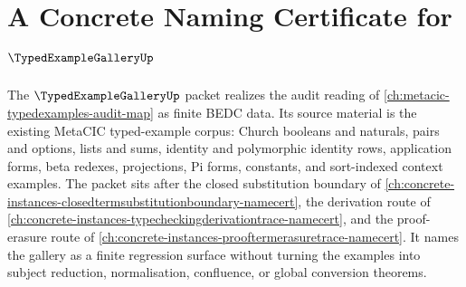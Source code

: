 \chapter{A Concrete Naming Certificate for $\TypedExampleGalleryUp$}
\label{ch:concrete-instances-typedexamplegallery-namecert}

The $\TypedExampleGalleryUp$ packet realizes the audit reading of \autoref{ch:metacic-typedexamples-audit-map} as finite BEDC data. Its source material is the existing MetaCIC typed-example corpus: Church booleans and naturals, pairs and options, lists and sums, identity and polymorphic identity rows, application forms, beta redexes, projections, Pi forms, constants, and sort-indexed context examples. The packet sits after the closed substitution boundary of \autoref{ch:concrete-instances-closedtermsubstitutionboundary-namecert}, the derivation route of \autoref{ch:concrete-instances-typecheckingderivationtrace-namecert}, and the proof-erasure route of \autoref{ch:concrete-instances-prooftermerasuretrace-namecert}. It names the gallery as a finite regression surface without turning the examples into subject reduction, normalisation, confluence, or global conversion theorems.

